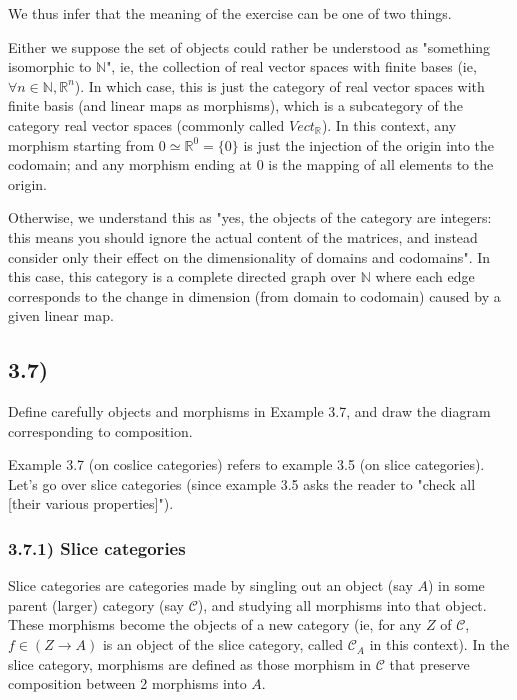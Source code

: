 We thus infer that the meaning of the exercise can be one of two things.

Either we suppose the set of objects could rather be understood as "something isomorphic to $\mathbb{N}$", ie, the collection of real vector spaces with finite bases (ie, $\forall n \in \mathbb{N}, \mathbb{R}^n$). In which case, this is just the category of real vector spaces with finite basis (and linear maps as morphisms), which is a subcategory of the category real vector spaces (commonly called $Vect_{\mathbb{R}}$). In this context, any morphism starting from $0 \simeq \mathbb{R}^0 = \{0\}$ is just the injection of the origin into the codomain; and any morphism ending at $0$ is the mapping of all elements to the origin.

Otherwise, we understand this as "yes, the objects of the category are integers: this means you should ignore the actual content of the matrices, and instead consider only their effect on the dimensionality of domains and codomains". In this case, this category is a complete directed graph over $\mathbb{N}$ where each edge corresponds to the change in dimension (from domain to codomain) caused by a given linear map.



\subsection*{3.7)}

Define carefully objects and morphisms in Example 3.7, and draw the diagram corresponding to composition.

Example 3.7 (on coslice categories) refers to example 3.5 (on slice categories). Let's go over slice categories (since example 3.5 asks the reader to "check all [their various properties]").

\subsubsection*{3.7.1) Slice categories}

Slice categories are categories made by singling out an object (say $A$) in some parent (larger) category (say $\mathcal{C}$), and studying all morphisms into that object. These morphisms become the objects of a new category (ie, for any $Z$ of $\mathcal{C}$, $f \in (Z \to A)$ is an object of the slice category, called $\mathcal{C}_A$ in this context). In the slice category, morphisms are defined as those morphism in $\mathcal{C}$ that preserve composition between 2 morphisms into $A$.

